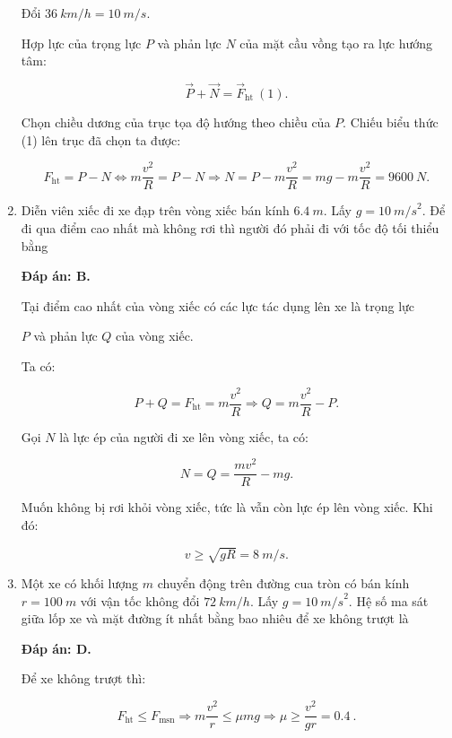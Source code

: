 \begin{enumerate}[label=\bfseries Câu \arabic*:]
{		Đổi $\SI{36}{km/h} = \SI{10}{m/s}.$
		
		Hợp lực của trọng lực $P$ và phản lực $N$ của mặt cầu vồng tạo ra lực hướng tâm:
		
		$$\vec P + \vec N = \vec F_\text{ht}\ (1).$$
		
		Chọn chiều dương của trục tọa độ hướng theo chiều của $P$. Chiếu biểu thức (1) lên trục đã chọn ta được:
		
		$$F_\text{ht} = P - N \Leftrightarrow m\dfrac{v^2}{R} = P - N \Rightarrow N = P - m\dfrac{v^2}{R} = mg - m\dfrac{v^2}{R} = \SI{9600}{N}.$$
	}
	\item {}
	
	
	{Diễn viên xiếc đi xe đạp trên vòng xiếc bán kính $\SI{6,4}{m}$. Lấy $g = \SI{10}{m/s}^2$. Để đi qua điểm cao nhất mà không rơi thì người đó phải đi với tốc độ tối thiểu bằng
	}
	
	\hideall
	{	\textbf{Đáp án: B.}
		
		Tại điểm cao nhất của vòng xiếc có các lực tác dụng lên xe là trọng lực
		
		$P$ và phản lực $Q$ của vòng xiếc.
		
		Ta có:
		
		$$P+Q = F_\text{ht} = m\dfrac{v^2}{R} \Rightarrow Q = m \dfrac{v^2}{R} - P.$$
		
		Gọi $N$ là lực ép của người đi xe lên vòng xiếc, ta có:
		
		$$N=Q = \dfrac{mv^2}{R} - mg.$$
		
		Muốn không bị rơi khỏi vòng xiếc, tức là vẫn còn lực ép lên vòng xiếc. Khi đó:
		
		$$ v \geq \sqrt{gR} = \SI{8}{m/s}.$$
	}
		\item {}
	
	
	{Một xe có khối lượng $m$ chuyển động trên đường cua tròn có bán kính $r = \SI{100}{m}$ với vận tốc không đổi $\SI{72}{km/h}$. Lấy $g = \SI{10}{m/s}^2$. Hệ số ma sát giữa lốp xe và mặt đường ít nhất bằng bao nhiêu để xe không trượt là
	}
	
	\hideall
	{	
		\textbf{Đáp án: D.}
		
		Để xe không trượt thì:
		
		$$F_\text{ht} \leq F_\text{msn} \Rightarrow m \dfrac{v^2}{r} \leq \mu mg \Rightarrow \mu \geq \dfrac{v^2}{gr} = \SI{0,4}{}.$$
	}
\end{enumerate}
